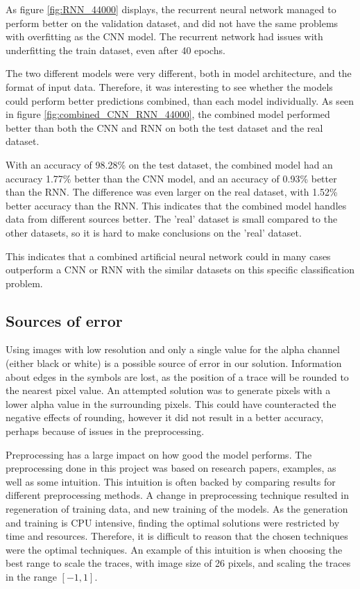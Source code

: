 As figure \ref{fig:RNN_44000} displays, the recurrent neural network managed to perform better on the validation dataset, and did not have the same problems with overfitting as the CNN model. The recurrent network had issues with underfitting the train dataset, even after 40 epochs. 

The two different models were very different, both in model architecture, and the format of input data. Therefore, it was interesting to see whether the models could perform better predictions combined, than each model individually. As seen in figure \ref{fig:combined_CNN_RNN_44000}, the combined model performed better than both the CNN and RNN on both the test dataset and the real dataset. 

With an accuracy of 98.28\% on the test dataset, the combined model had an accuracy 1.77\% better than the CNN model, and an accuracy of 0.93\% better than the RNN. The difference was even larger on the real dataset, with 1.52\% better accuracy than the RNN. This indicates that the combined model handles data from different sources better. The 'real' dataset is small compared to the other datasets, so it is hard to make conclusions on the 'real' dataset. 

This indicates that a combined artificial neural network could in many cases outperform a CNN or RNN with the similar datasets on this specific classification problem. 

\subsection{Sources of error}

Using images with low resolution and only a single value for the alpha channel (either black or white) is a possible source of error in our solution. Information about edges in the symbols are lost, as the position of a trace will be rounded to the nearest pixel value. An attempted solution was to generate pixels with a lower alpha value in the surrounding pixels. This could have counteracted the negative effects of rounding, however it did not result in a better accuracy, perhaps because of issues in the preprocessing.

Preprocessing has a large impact on how good the model performs. The preprocessing done in this project was based on research papers, examples, as well as some intuition. This intuition is often backed by comparing results for different preprocessing methods. A change in preprocessing technique resulted in regeneration of training data, and new training of the models. As the generation and training is CPU intensive, finding the optimal solutions were restricted by time and resources. Therefore, it is difficult to reason that the chosen techniques were the optimal techniques. An example of this intuition is when choosing the best range to scale the traces, with image size of 26 pixels, and scaling the traces in the range $[-1, 1]$. 

